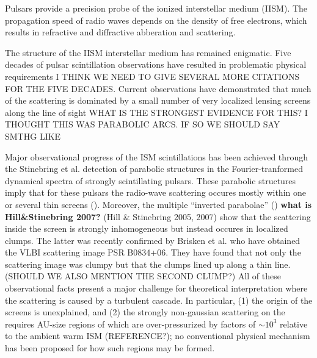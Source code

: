 \documentclass[useAMS,usenatbib]{mn2e}
\begin{document}
Pulsars provide a precision probe of the ionized interstellar medium
(IISM).  The propagation speed of radio waves depends on the density
of free electrons, which results in refractive and diffractive
abberation and scattering. 

The structure of the IISM
interstellar medium has remained enigmatic. Five
decades of pulsar scintillation observations \cite{1968Natur.218..920S}
have resulted in problematic physical requirements I THINK WE NEED TO GIVE SEVERAL MORE CITATIONS
FOR THE FIVE DECADES.  Current
observations have demonstrated that much of the scattering is
dominated by a small number of very localized lensing
screens \citep{2010ApJ...708..232B} along the line of sight WHAT IS THE STRONGEST EVIDENCE 
FOR THIS? I THOUGHT THIS WAS PARABOLIC ARCS. IF SO WE SHOULD SAY SMTHG LIKE

Major observational progress of the ISM scintillations has been
achieved through the Stinebring et al.\citet{2001ApJ...549L..97S}
detection of parabolic structures in the Fourier-tranformed dynamical
spectra of strongly scintillating pulsars. These parabolic structures
imply that for these pulsars the radio-wave scattering occures mostly
within one or several thin screens
(\cite{2004MNRAS.354...43W,2006ApJ...637..346C,2008MNRAS.388.1214W}).
Moreover, the multiple ``inverted
parabolae'' (\cite{2005ApJ...619L.171H})
{\bf what is Hill&Stinebring 2007?}
(Hill \& Stinebring 2005, 2007) show that the scattering
inside the screen is strongly inhomogeneous but instead occures in
localized clumps. The latter was recently confirmed by Brisken et
al.\cite{2010ApJ...708..232B} who have obtained the VLBI scattering
image PSR B0834+06. They
have found that not only the scattering image was clumpy but that the
clumps lined up along a thin line.
(SHOULD WE ALSO MENTION THE
SECOND CLUMP?)
All of these
observational facts present a major challenge for theoretical
interpretation where the scattering is caused by a turbulent
cascade. In particular, (1) the origin of the screens is unexplained,
and (2) the strongly non-gaussian scattering on the requires AU-size
regions of which are over-pressurized by factors of $\sim 10^3$
relative to the ambient warm ISM (REFERENCE?); no conventional
physical mechanism has been proposed for how such regions may be
formed.
\end{document}
